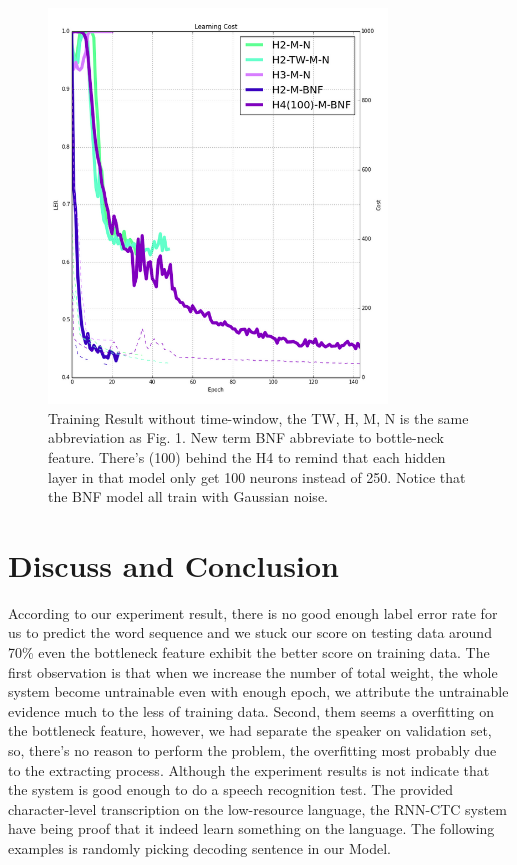 \documentclass[conference]{IEEEtran}
\begin{document}
\begin{figure}[h]
\includegraphics[width=9cm]{best_result_thin.png}
\caption{ Training Result without time-window, the TW, H, M, N is the same abbreviation as Fig. 1. New term BNF abbreviate to bottle-neck feature.  There's (100) behind the H4 to remind that each hidden layer in that model only get 100 neurons instead of 250.  Notice that the BNF model all train with Gaussian noise. }
\end{figure}


\section{Discuss and Conclusion}
According to our experiment result, there is no good enough label error rate for us to predict the word sequence and we stuck our score on testing data around 70\% even the bottleneck feature exhibit the better score on training data.  The first observation is that when we increase the number of total weight, the whole system become untrainable even with enough epoch, we attribute the untrainable evidence much to the less of training data.  Second, them seems a overfitting on the bottleneck feature, however, we had separate the speaker on validation set, so, there's no reason to perform the problem, the overfitting most probably due to the extracting process.  Although the experiment results is not indicate that the system is good enough to do a speech recognition test.  The provided character-level transcription on the low-resource language, the RNN-CTC system have being proof that it indeed learn something on the language.  The following examples is randomly picking decoding sentence in our Model. \\
\end{document}
